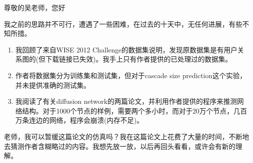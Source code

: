 \documentclass[UTF8]{ctexart}
\begin{document}
\par 尊敬的吴老师，您好
\newline
\par 我之前的思路并不可行，遭遇了一些困难，在过去的十天中，无任何进展，有些不知所措。
\begin{enumerate}[\indent 1)]
    \item 我回顾了来自WISE 2012 Challenge的数据集说明，发现原数据集是有用户关系图的(但下载链接已失效)。我手上只有作者提供的已处理过的数据集。
    \item 作者将数据集分为训练集和测试集，但对于cascade size prediction这个实验，并未提供准确的测试集。
    \item 我阅读了有关diffusion network的两篇论文，并利用作者提供的程序来推测网络结构。对于1000个节点的样例，需要两个多小时，而对于20万个节点，几百万条连边的网络，程序会崩溃(内存不足)。
\end{enumerate}

\par 老师，我可以暂缓这篇论文的仿真吗？我在这篇论文上花费了大量的时间，不断地去猜测作者含糊略过的内容。我想先放一放，以后再回头看看，或许会有新的理解。
\newline
\par {}
\end{document}
